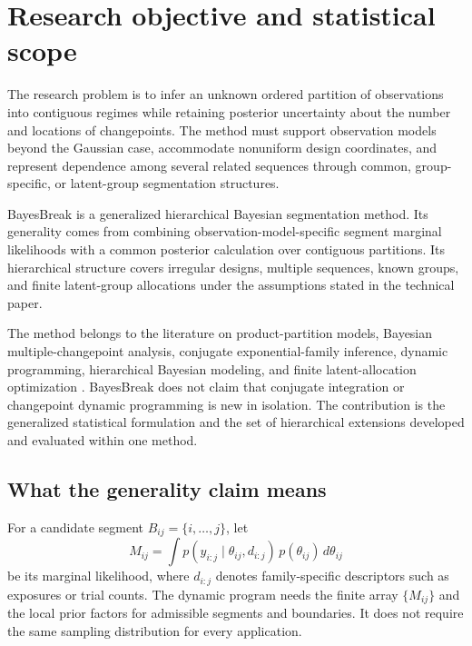 \section{Research objective and statistical scope}
\label{sec:exec-objective}

The research problem is to infer an unknown ordered partition of observations into contiguous regimes while retaining posterior uncertainty about the number and locations of changepoints. The method must support observation models beyond the Gaussian case, accommodate nonuniform design coordinates, and represent dependence among several related sequences through common, group-specific, or latent-group segmentation structures.

\begin{keyclaim}
BayesBreak is a generalized hierarchical Bayesian segmentation method. Its generality comes from combining observation-model-specific segment marginal likelihoods with a common posterior calculation over contiguous partitions. Its hierarchical structure covers irregular designs, multiple sequences, known groups, and finite latent-group allocations under the assumptions stated in the technical paper.
\end{keyclaim}

The method belongs to the literature on product-partition models, Bayesian multiple-changepoint analysis, conjugate exponential-family inference, dynamic programming, hierarchical Bayesian modeling, and finite latent-allocation optimization \citep{barry1992ppm,barry1993bayesCP,diaconis1979conjugate,fearnhead2006exact,hutter2006bpcr}. BayesBreak does not claim that conjugate integration or changepoint dynamic programming is new in isolation. The contribution is the generalized statistical formulation and the set of hierarchical extensions developed and evaluated within one method.

\subsection{What the generality claim means}

For a candidate segment $B_{ij}=\{i,\ldots,j\}$, let
\[
  M_{ij}=\int p(y_{i:j}\mid\theta_{ij},d_{i:j})\,p(\theta_{ij})\,d\theta_{ij}
\]
be its marginal likelihood, where $d_{i:j}$ denotes family-specific descriptors such as exposures or trial counts. The dynamic program needs the finite array $\{M_{ij}\}$ and the local prior factors for admissible segments and boundaries. It does not require the same sampling distribution for every application.

